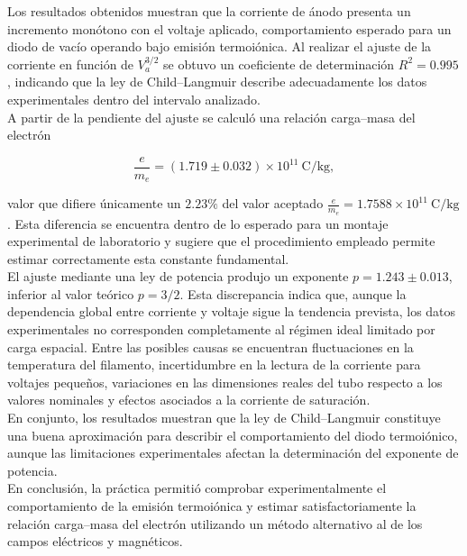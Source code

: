 Los resultados obtenidos muestran que la corriente de ánodo presenta un incremento
monótono con el voltaje aplicado, comportamiento esperado para un diodo de vacío
operando bajo emisión termoiónica. Al realizar el ajuste de la corriente en función
de $V_a^{3/2}$ se obtuvo un coeficiente de determinación $R^2=0.995$, indicando que
la ley de Child--Langmuir describe adecuadamente los datos experimentales dentro del
intervalo analizado.\\

A partir de la pendiente del ajuste se calculó una relación carga--masa del electrón

\[
\frac{e}{m_e}=(1.719\pm0.032)\times10^{11}\ \mathrm{C/kg},
\]

valor que difiere únicamente un $2.23\%$ del valor aceptado
$\frac{e}{m_e}=1.7588\times10^{11}\ \mathrm{C/kg}$.
Esta diferencia se encuentra dentro de lo esperado para un montaje experimental de
laboratorio y sugiere que el procedimiento empleado permite estimar correctamente
esta constante fundamental.\\

El ajuste mediante una ley de potencia produjo un exponente
$p=1.243\pm0.013$, inferior al valor teórico $p=3/2$. Esta discrepancia indica que,
aunque la dependencia global entre corriente y voltaje sigue la tendencia prevista,
los datos experimentales no corresponden completamente al régimen ideal limitado por
carga espacial. Entre las posibles causas se encuentran fluctuaciones en la
temperatura del filamento, incertidumbre en la lectura de la corriente para voltajes
pequeños, variaciones en las dimensiones reales del tubo respecto a los valores
nominales y efectos asociados a la corriente de saturación.\\

En conjunto, los resultados muestran que la ley de Child--Langmuir constituye una
buena aproximación para describir el comportamiento del diodo termoiónico, aunque
las limitaciones experimentales afectan la determinación del exponente de potencia.\\

En conclusión, la práctica permitió comprobar experimentalmente el comportamiento
de la emisión termoiónica y estimar satisfactoriamente la relación carga--masa del
electrón utilizando un método alternativo al de los campos eléctricos y magnéticos.